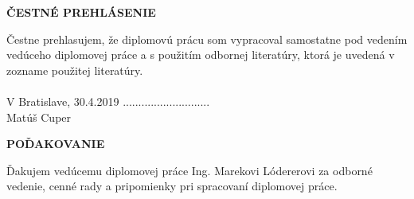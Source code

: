 \documentclass[a4paper,twoside,slovak,12pt,appendix]{article}
\begin{document}

\begin{titlepage}
  \vspace*{15cm}
  \begin{large}
    \noindent \textbf{ČESTNÉ PREHLÁSENIE} \par
  \end{large}
  \vspace*{0.5cm}
  \noindent
  Čestne prehlasujem, že diplomovú prácu som vypracoval samostatne pod vedením
  vedúceho diplomovej práce a s použitím odbornej literatúry, ktorá je uvedená
  v zozname použitej literatúry. \\
  \vspace*{0.5cm}\\
  V Bratislave, 30.4.2019 \hspace*{6cm}............................\\
  \hspace*{10.4cm} Matúš Cuper
  \end{titlepage}
  \newpage\null\thispagestyle{empty}\newpage

  \begin{titlepage}
  \vspace*{15cm}
  \begin{large}
    \noindent \textbf{POĎAKOVANIE} \par
  \end{large}
  \vspace*{0.5cm}
  \noindent
  Ďakujem vedúcemu diplomovej práce Ing. Marekovi Lódererovi za odborné vedenie,
  cenné rady a pripomienky pri spracovaní diplomovej práce.
  \end{titlepage}
  \newpage\null\thispagestyle{empty}\newpage


\end{document}
